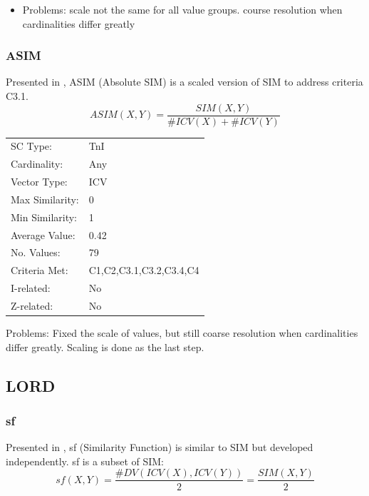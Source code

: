 \documentclass{article}
\begin{document}
\begin{itemize}
\item Problems: scale not the same for all value groups. course resolution
  when cardinalities differ greatly
\end{itemize}
\subsubsection{ASIM}
\label{sec-13-1-3}

Presented in \citet[pp. 450]{Morris1979}, ASIM (Absolute SIM) is a
scaled version of SIM to address criteria C3.1.
$$ASIM\left(X,Y\right)=\frac{SIM\left(X,Y\right)}{\#ICV\left(X\right)+\#ICV\left(Y\right)}$$

\begin{center}
\begin{tabular}{ll}
 SC Type:         &  TnI                      \\
 Cardinality:     &  Any                      \\
 Vector Type:     &  ICV                      \\
 Max Similarity:  &  0                        \\
 Min Similarity:  &  1                        \\
 Average Value:   &  0.42                     \\
 No. Values:      &  79                       \\
 Criteria Met:    &  C1,C2,C3.1,C3.2,C3.4,C4  \\
 I-related:       &  No                       \\
 Z-related:       &  No                       \\
\end{tabular}
\end{center}


Problems: Fixed the scale of values, but still coarse resolution when
cardinalities differ greatly. Scaling is done as the last step.
\subsection{LORD}
\label{sec-13-2}
\subsubsection{sf}
\label{sec-13-2-1}

Presented in \cite[pp. 93]{Lord1981}, sf (Similarity Function) is
similar to SIM but developed independently. sf is a subset of SIM:
$$sf\left(X,Y\right)=\frac{\#DV\left(ICV\left(X\right),ICV\left(Y\right)\right)}{2}=\frac{SIM(X,Y)}{2}$$
\end{document}
